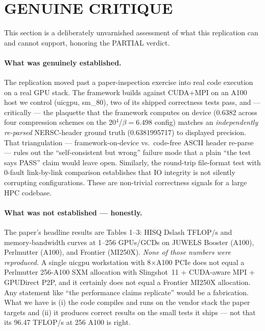 \documentclass[11pt]{article}
\begin{document}
\section{GENUINE CRITIQUE}
This section is a deliberately unvarnished assessment of what this replication can and cannot support, honoring the PARTIAL verdict.

\paragraph{What was genuinely established.}
The replication moved past a paper-inspection exercise into real code execution on a real GPU stack. The framework builds against CUDA+MPI on an A100 host we control (uicgpu, sm\_80), two of its shipped correctness tests pass, and --- critically --- the plaquette that the framework computes on device (0.6382 across four compression schemes on the 20$^4$/$\beta{=}6.498$ config) matches an \emph{independently re-parsed} NERSC-header ground truth (0.6381995717) to displayed precision. That triangulation --- framework-on-device vs.\ code-free ASCII header re-parse --- rules out the ``self-consistent but wrong'' failure mode that a plain ``the test says PASS'' claim would leave open. Similarly, the round-trip file-format test with 0-fault link-by-link comparison establishes that IO integrity is not silently corrupting configurations. These are non-trivial correctness signals for a large HPC codebase.

\paragraph{What was not established --- honestly.}
The paper's headline results are Tables 1--3: HISQ Dslash TFLOP/s and memory-bandwidth curves at 1--256 GPUs/GCDs on JUWELS Booster (A100), Perlmutter (A100), and Frontier (MI250X). \emph{None of those numbers were reproduced.} A single uicgpu workstation with 8$\times$A100 PCIe does not equal a Perlmutter 256-A100 SXM allocation with Slingshot~11 + CUDA-aware MPI + GPUDirect P2P, and it certainly does not equal a Frontier MI250X allocation. Any statement like ``the performance claims replicate'' would be a fabrication. What we have is (i) the code compiles and runs on the vendor stack the paper targets and (ii) it produces correct results on the small tests it ships --- not that its 96.47 TFLOP/s at 256 A100 is right.
\end{document}
